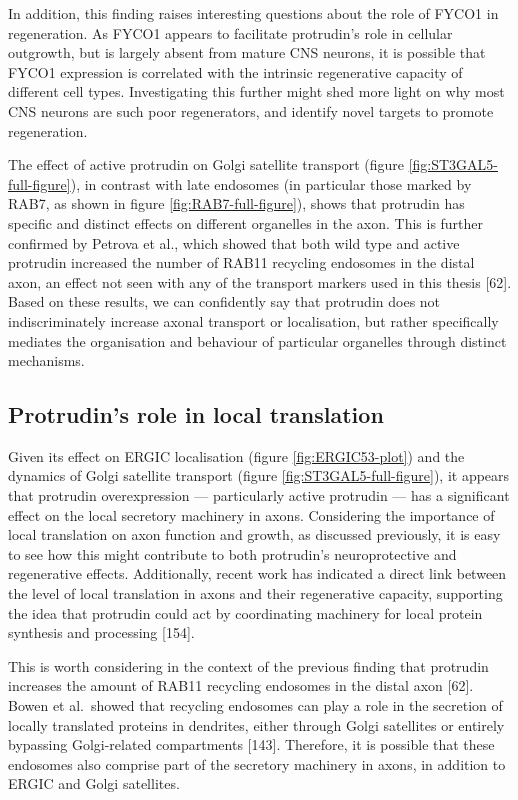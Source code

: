 \documentclass[
  12pt,
  a4paper,
]{book}
\begin{document}
In addition, this finding raises interesting questions about the role of FYCO1 in regeneration. As FYCO1 appears to facilitate protrudin's role in cellular outgrowth, but is largely absent from mature CNS neurons, it is possible that FYCO1 expression is correlated with the intrinsic regenerative capacity of different cell types. Investigating this further might shed more light on why most CNS neurons are such poor regenerators, and identify novel targets to promote regeneration.

The effect of active protrudin on Golgi satellite transport (figure \ref{fig:ST3GAL5-full-figure}), in contrast with late endosomes (in particular those marked by RAB7, as shown in figure \ref{fig:RAB7-full-figure}), shows that protrudin has specific and distinct effects on different organelles in the axon. This is further confirmed by Petrova et al., which showed that both wild type and active protrudin increased the number of RAB11 recycling endosomes in the distal axon, an effect not seen with any of the transport markers used in this thesis {[}62{]}. Based on these results, we can confidently say that protrudin does not indiscriminately increase axonal transport or localisation, but rather specifically mediates the organisation and behaviour of particular organelles through distinct mechanisms.

\hypertarget{protrudins-role-in-local-translation}{%
\subsection{Protrudin's role in local translation}\label{protrudins-role-in-local-translation}}

Given its effect on ERGIC localisation (figure \ref{fig:ERGIC53-plot}) and the dynamics of Golgi satellite transport (figure \ref{fig:ST3GAL5-full-figure}), it appears that protrudin overexpression --- particularly active protrudin --- has a significant effect on the local secretory machinery in axons. Considering the importance of local translation on axon function and growth, as discussed previously, it is easy to see how this might contribute to both protrudin's neuroprotective and regenerative effects. Additionally, recent work has indicated a direct link between the level of local translation in axons and their regenerative capacity, supporting the idea that protrudin could act by coordinating machinery for local protein synthesis and processing {[}154{]}.

This is worth considering in the context of the previous finding that protrudin increases the amount of RAB11 recycling endosomes in the distal axon {[}62{]}. Bowen et al.~showed that recycling endosomes can play a role in the secretion of locally translated proteins in dendrites, either through Golgi satellites or entirely bypassing Golgi-related compartments {[}143{]}. Therefore, it is possible that these endosomes also comprise part of the secretory machinery in axons, in addition to ERGIC and Golgi satellites.
\end{document}
